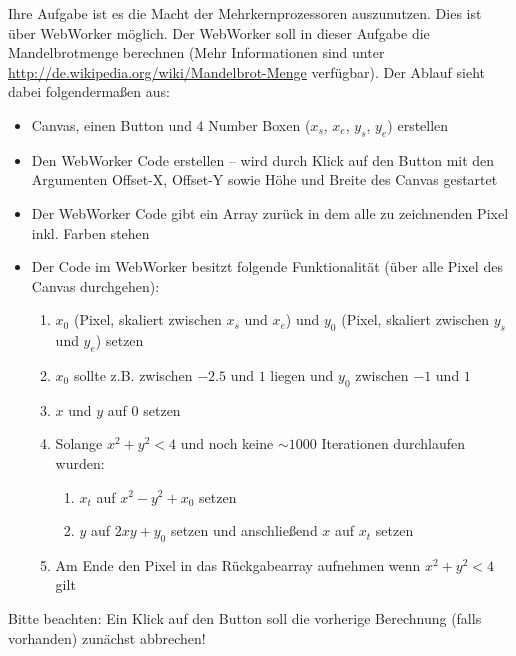 %
\par Ihre Aufgabe ist es die Macht der Mehrkernprozessoren auszunutzen. Dies
ist über WebWorker möglich. Der WebWorker soll in dieser Aufgabe die
Mandelbrotmenge berechnen (Mehr Informationen sind unter
\url{http://de.wikipedia.org/wiki/Mandelbrot-Menge} verfügbar). Der Ablauf
sieht dabei folgendermaßen aus:
%
\begin{itemize}
\item
Canvas, einen Button und $4$ Number Boxen ($x_s$, $x_e$, $y_s$, $y_e$)
erstellen
\item
Den WebWorker Code erstellen – wird durch Klick auf den Button mit den
Argumenten Offset-X, Offset-Y sowie Höhe und Breite des Canvas gestartet
\item
Der WebWorker Code gibt ein Array zurück in dem alle zu zeichnenden Pixel
inkl. Farben stehen
\item
Der Code im WebWorker besitzt folgende Funktionalität (über alle Pixel des
Canvas durchgehen):
%
	\begin{enumerate}
	\item
	$x_0$ (Pixel, skaliert zwischen $x_s$ und $x_e$) und $y_0$ (Pixel, skaliert
	zwischen $y_s$ und $y_e$) setzen
	\item
	$x_0$ sollte z.B. zwischen $-2.5$ und $1$ liegen und $y_0$ zwischen $-1$
	und $1$
	\item
	$x$ und $y$ auf $0$ setzen
	\item
	Solange $x^2 + y^2 < 4$ und noch keine $\sim 1000$ Iterationen durchlaufen
	wurden:
%
		\begin{enumerate}
		\item
		$x_t$ auf $x^2 - y^2 + x_0$ setzen
		\item
		$y$ auf $2xy + y_0$ setzen und anschließend $x$ auf $x_t$ setzen
		\end{enumerate}
%
	\item 
	Am Ende den Pixel in das Rückgabearray aufnehmen wenn $x^2 + y^2 < 4$ gilt
	\end{enumerate}
%
\end{itemize}
%
\par Bitte beachten: Ein Klick auf den Button soll die vorherige Berechnung
(falls vorhanden) zunächst abbrechen!